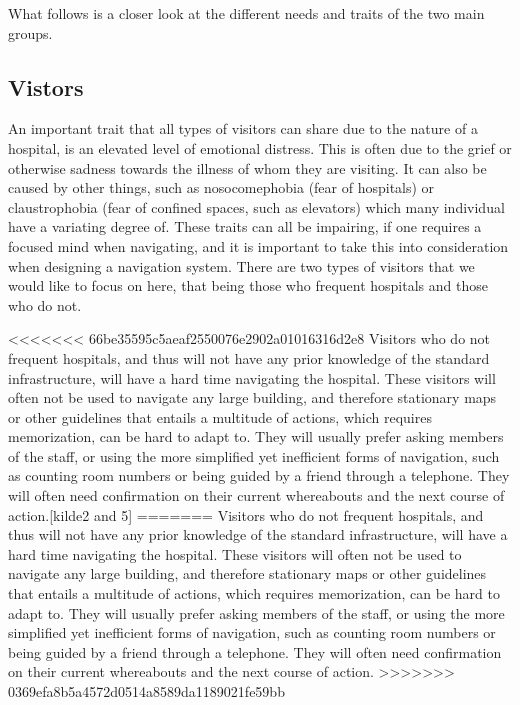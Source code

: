 What follows is a closer look at the different needs and traits of the two main groups.

\subsection{Vistors} %
 \label{par:vistors}
 
An important trait that all types of visitors can share due to the nature of a hospital, is an elevated level of emotional distress. This is often due to the grief or otherwise sadness towards the illness of whom they are visiting. It can also be caused by other things, such as nosocomephobia (fear of hospitals) or claustrophobia (fear of confined spaces, such as elevators) which many individual have a variating degree of.\cite{individforskellige} These traits can all be impairing, if one requires a focused mind when navigating, and it is important to take this into consideration when designing a navigation system. There are two types of visitors that we would like to focus on here, that being those who frequent hospitals and those who do not.

<<<<<<< 66be35595c5aeaf2550076e2902a01016316d2e8
Visitors who do not frequent hospitals, and thus will not have any prior knowledge of the standard infrastructure, will have a hard time navigating the hospital. These visitors will often not be used to navigate any large building, and therefore stationary maps or other guidelines that entails a multitude of actions, which requires memorization, can be hard to adapt to. They will usually prefer asking members of the staff, or using the more simplified yet inefficient forms of navigation, such as counting room numbers or being guided by a friend through a telephone. They will often need confirmation on their current whereabouts and the next course of action.[kilde2 and 5]
=======
Visitors who do not frequent hospitals, and thus will not have any prior knowledge of the standard infrastructure, will have a hard time navigating the hospital. These visitors will often not be used to navigate any large building, and therefore stationary maps or other guidelines that entails a multitude of actions, which requires memorization, can be hard to adapt to. They will usually prefer asking members of the staff, or using the more simplified yet inefficient forms of navigation, such as counting room numbers or being guided by a friend through a telephone. They will often need confirmation on their current whereabouts and the next course of action.\cite{naturtalenter}\cite{individforskellige}
>>>>>>> 0369efa8b5a4572d0514a8589da1189021fe59bb

